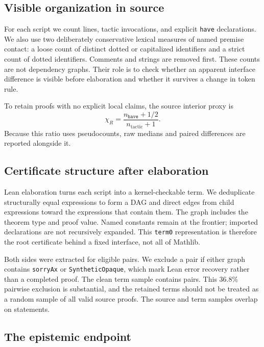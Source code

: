 \documentclass[11pt]{article}
\newcommand{\code}[1]{\texttt{#1}}
\begin{document}
\subsection{Visible organization in source}

For each script we count lines, tactic invocations, and explicit \code{have} declarations.  We also
use two deliberately conservative lexical measures of named premise contact: a loose count of
distinct dotted or capitalized identifiers and a strict count of dotted identifiers.  Comments and
strings are removed first.  These counts are not dependency graphs.  Their role is to check whether
an apparent interface difference is visible before elaboration and whether it survives a change in
token rule.

To retain proofs with no explicit local claims, the source interior proxy is
\begin{equation}
  \chi_R=\frac{n_{\code{have}}+1/2}{n_{\mathrm{tactic}}+1}.
\end{equation}
Because this ratio uses pseudocounts, raw medians and paired differences are reported alongside it.

\subsection{Certificate structure after elaboration}

Lean elaboration turns each script into a kernel-checkable term.  We deduplicate structurally equal
expressions to form a DAG and direct edges from child expressions toward the expressions that
contain them.  The graph includes the theorem type and proof value.  Named constants remain at the
frontier; imported declarations are not recursively expanded.  This \code{term0} representation is
therefore the root certificate behind a fixed interface, not all of Mathlib.

Both sides were extracted for \EligibleTermPairs{} eligible pairs.  We exclude a pair if either graph
contains \code{sorryAx} or \code{SyntheticOpaque}, which mark Lean error recovery rather than a
completed proof.  The clean term sample contains \TermPairs{} pairs.  This 36.8\% pairwise exclusion
is substantial, and the retained terms should not be treated as a random sample of all valid source
proofs.  The source and term samples overlap on \CrossLayerN{} statements.

\subsection{The epistemic endpoint}
\end{document}
